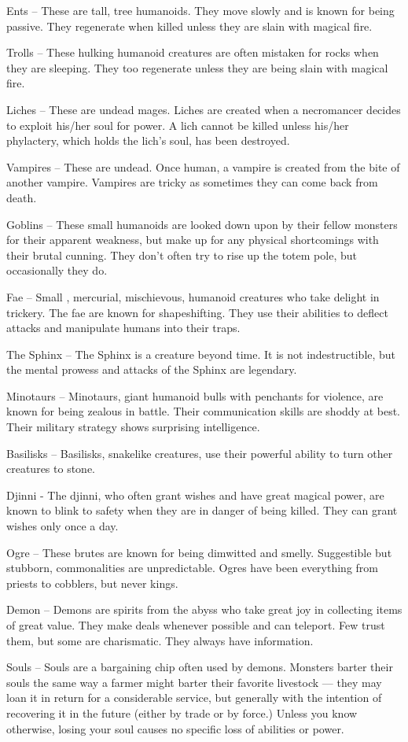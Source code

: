 \documentclass[blue]{guildcamp2}
\begin{document}
Ents -- These are tall, tree humanoids. They move slowly and is known for being passive. They regenerate when killed unless they are slain with magical fire.

Trolls -- These hulking humanoid creatures are often mistaken for rocks when they are sleeping. They too regenerate unless they are being slain with magical fire.

Liches -- These are undead mages. Liches are created when a necromancer decides to exploit his/her soul for power. A lich cannot be killed unless his/her phylactery, which holds the lich's soul, has been destroyed.

Vampires -- These are undead. Once human, a vampire is created from the bite of another vampire. Vampires are tricky as sometimes they can come back from death.

Goblins -- These small humanoids are looked down upon by their fellow monsters for their apparent weakness, but make up for any physical shortcomings with their brutal cunning. They don't often try to rise up the totem pole, but occasionally they do.

Fae -- Small , mercurial, mischievous, humanoid creatures who take delight in trickery. The fae are known for shapeshifting. They use their abilities to deflect attacks and manipulate humans into their traps.

The Sphinx -- The Sphinx is a creature beyond time. It is not indestructible, but the mental prowess and attacks of the Sphinx are legendary. 

Minotaurs -- Minotaurs, giant humanoid bulls with penchants for violence, are known for being zealous in battle. Their communication skills are shoddy at best. Their military strategy shows surprising intelligence.

Basilisks -- Basilisks, snakelike creatures, use their powerful ability to turn other creatures to stone.

Djinni - The djinni, who often grant wishes and have great magical power, are known to blink to safety when they are in danger of being killed. They can grant wishes only once a day.

Ogre -- These brutes are known for being dimwitted and smelly. Suggestible but stubborn, commonalities are unpredictable. Ogres have been everything from priests to cobblers, but never kings.

Demon -- Demons are spirits from the abyss who take great joy in collecting items of great value. They make deals whenever possible and can teleport. Few trust them, but some are charismatic. They always have information.

Souls -- Souls are a bargaining chip often used by demons. Monsters barter their souls the same way a farmer might barter their favorite livestock --- they may loan it in return for a considerable service, but generally with the intention of recovering it in the future (either by trade or by force.) Unless you know otherwise, losing your soul causes no specific loss of abilities or power.
\end{document}
